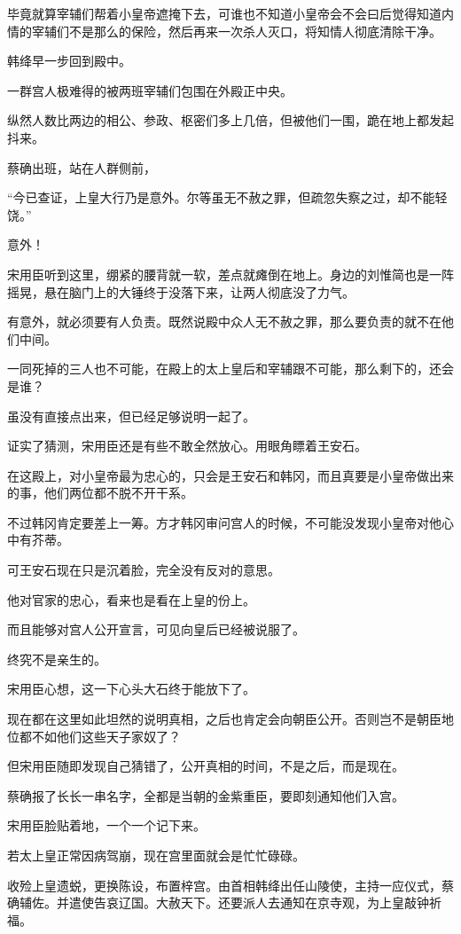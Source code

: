 毕竟就算宰辅们帮着小皇帝遮掩下去，可谁也不知道小皇帝会不会曰后觉得知道内情的宰辅们不是那么的保险，然后再来一次杀人灭口，将知情人彻底清除干净。

韩绛早一步回到殿中。

一群宫人极难得的被两班宰辅们包围在外殿正中央。

纵然人数比两边的相公、参政、枢密们多上几倍，但被他们一围，跪在地上都发起抖来。

蔡确出班，站在人群侧前，

“今已查证，上皇大行乃是意外。尔等虽无不赦之罪，但疏忽失察之过，却不能轻饶。”

意外！

宋用臣听到这里，绷紧的腰背就一软，差点就瘫倒在地上。身边的刘惟简也是一阵摇晃，悬在脑门上的大锤终于没落下来，让两人彻底没了力气。

有意外，就必须要有人负责。既然说殿中众人无不赦之罪，那么要负责的就不在他们中间。

一同死掉的三人也不可能，在殿上的太上皇后和宰辅跟不可能，那么剩下的，还会是谁？

虽没有直接点出来，但已经足够说明一起了。

证实了猜测，宋用臣还是有些不敢全然放心。用眼角瞟着王安石。

在这殿上，对小皇帝最为忠心的，只会是王安石和韩冈，而且真要是小皇帝做出来的事，他们两位都不脱不开干系。

不过韩冈肯定要差上一筹。方才韩冈审问宫人的时候，不可能没发现小皇帝对他心中有芥蒂。

可王安石现在只是沉着脸，完全没有反对的意思。

他对官家的忠心，看来也是看在上皇的份上。

而且能够对宫人公开宣言，可见向皇后已经被说服了。

终究不是亲生的。

宋用臣心想，这一下心头大石终于能放下了。

现在都在这里如此坦然的说明真相，之后也肯定会向朝臣公开。否则岂不是朝臣地位都不如他们这些天子家奴了？

但宋用臣随即发现自己猜错了，公开真相的时间，不是之后，而是现在。

蔡确报了长长一串名字，全都是当朝的金紫重臣，要即刻通知他们入宫。

宋用臣脸贴着地，一个一个记下来。

若太上皇正常因病驾崩，现在宫里面就会是忙忙碌碌。

收殓上皇遗蜕，更换陈设，布置梓宫。由首相韩绛出任山陵使，主持一应仪式，蔡确辅佐。并遣使告哀辽国。大赦天下。还要派人去通知在京寺观，为上皇敲钟祈福。

